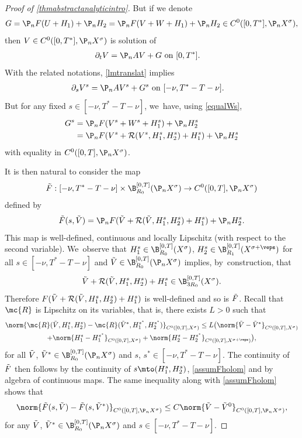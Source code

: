\begin{proof}[Proof of \cref{thmabstractanalyticintro}]
But if we denote
\[
G=\P_n F(U+H_{1})+\P_n H_{2}=\P_n F(V+W+H_{1})+\P_n H_{2}\in C^0([0,T^*],\P_n X^{\sigma}),
\]
then $V\in C^0([0,T^*],\P_n X^{\sigma})$ is solution of
\begin{align*}
\partial_t V=\P_n AV+G& \textnormal{ on } [0,T^{*}].
\end{align*}
With the related notations, \cref{lmtranslat} implies
\begin{align}
\label{eqVG}
\partial_s V^s=\P_n AV^s+G^s& \textnormal{ on } [-\nu, T^*-T-\nu].
\end{align}
But for any fixed $s\in [-\nu, T^*-T-\nu]$, we~have, using \eqref{equalWs},
\begin{align*}
G^s&=\P_n F(V^s+W^s+H_{1}^s)+\P_n H_{2}^s\\ &=\P_n F(V^s+\mathcal{R}(V^s,H_{1}^s,H_{2}^s)+H_{1}^s)+\P_n H_{2}^s
\end{align*}
with equality in $C^0([0,T], \P_n X^{\sigma})$.

It is then natural to consider the map
\begin{align*}
\Tilde{F}: [-\nu, T^*-T-\nu]\times \B_{R_{0}}^{[0,T]}(\P_n X^{\sigma})\to C^0([0, T], \P_n X^\sigma)
\end{align*}
defined by
\begin{align*}
\Tilde{F}(s,\Tilde{V})=\P_n F(\Tilde{V}+\mathcal{R}(\Tilde{V},H_{1}^s,H_{2}^s)+H_{1}^s)+\P_n H_{2}^s.
\end{align*}
This map is well-defined, continuous and locally Lipschitz (with respect to the second variable). We~observe that $H_1^s\in \B_{R_0}^{[0, T]}(X^\sigma)$, $H_2^s\in \B_{R_{1}}^{[0, T]}(X^{\sigma+\veps})$ for all \hbox{$s\in [-\nu, T^*-T-\nu]$} and $\Tilde{V}\in \B_{R_{0}}^{[0,T]}(\P_n X^{\sigma})$ implies, by~construction, that
\[
\Tilde{V}+\mathcal{R}(\Tilde{V},H_{1}^s,H_{2}^s)+H_{1}^s\in \B_{3R_0}^{[0, T]}(X^\sigma).
\]
Therefore $F(\Tilde{V}+\mathcal{R}(\Tilde{V},H_{1}^s,H_{2}^s)+H_{1}^s)$ is well-defined and so is $\Tilde{F}$. Recall that $\mc{R}$ is Lipschitz on its variables, that is, there exists $L>0$ such that
\begin{multline*}
\norm{\mc{R}(\Tilde{V}, H_{1}^{s}, H_2^{s})-\mc{R}(\Tilde{V}^*, H_{1}^{s^*}, H_2^{s^*})}_{C^0([0, T], X^\sigma)}\leq L\big( \norm{\Tilde{V}-\Tilde{V}^*}_{C^0([0, T], X^\sigma)}\\+\norm{H_1^{s}-H_1^{s^*}}_{C^0([0, T], X^\sigma)}+\norm{H_2^{s}-H_2^{s^*}}_{C^0([0, T], X^{\sigma+\veps})} \big),
\end{multline*}
for all $\Tilde{V}$, $\Tilde{V}^*\in \B_{R_{0}}^{[0,T]}(\P_n X^{\sigma})$ and $s$, $s^*\in [-\nu, T^*-T-\nu]$. The continuity of $\Tilde{F}$ then follows by the continuity of $s\mto (H_1^s, H_2^s)$, \cref{assumFholom} and by algebra of continuous maps. The same inequality along with \cref{assumFholom} shows that
\begin{align*}
\norm{\Tilde{F}(s, \Tilde{V})-\Tilde{F}(s, \Tilde{V}^*)}_{C^0([0, T], \P_n X^\sigma)}\leq C\norm{\Tilde{V}-\Tilde{V}^0}_{C^0([0, T], \P_n X^\sigma)},
\end{align*}
for any $\Tilde{V}$, $\Tilde{V}^*\in \B_{R_{0}}^{[0,T]}(\P_n X^{\sigma})$ and $s\in [-\nu, T^*-T-\nu]$.


\end{proof}
